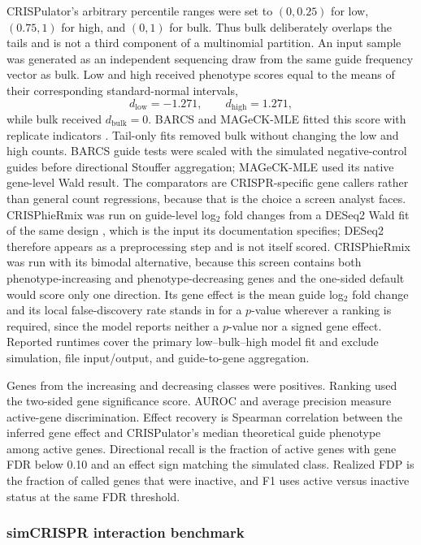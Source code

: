 CRISPulator's arbitrary percentile ranges were set to $(0,0.25)$ for low,
$(0.75,1)$ for high, and $(0,1)$ for bulk.  Thus bulk deliberately overlaps
the tails and is not a third component of a multinomial partition.  An input
sample was generated as an independent sequencing draw from the same guide
frequency vector as bulk.  Low and high received phenotype scores equal to
the means of their corresponding standard-normal intervals,
\[
 d_{\mathrm{low}}=-1.271,\qquad
 d_{\mathrm{high}}=1.271,
\]
while bulk received $d_{\mathrm{bulk}}=0$.  BARCS and MAGeCK-MLE fitted this
score with replicate indicators \citep{li2015mageckvispr}.
Tail-only fits removed bulk without changing the low and high counts.  BARCS
guide tests were scaled with the simulated negative-control guides before
directional Stouffer aggregation; MAGeCK-MLE used its native gene-level Wald
result.  The comparators are CRISPR-specific gene callers rather than general
count regressions, because that is the choice a screen analyst faces.
CRISPhieRmix \citep{daley2018crisphiermix} was run on guide-level log$_2$
fold changes from a DESeq2 Wald fit of the same design
\citep{love2014deseq2}, which is the input its documentation specifies;
DESeq2 therefore appears as a preprocessing step and is not itself scored.
CRISPhieRmix was run with its bimodal alternative, because this screen
contains both phenotype-increasing and phenotype-decreasing genes and the
one-sided default would score only one direction.  Its gene effect is the
mean guide log$_2$ fold change and its local false-discovery rate stands in
for a $p$-value wherever a ranking is required, since the model reports
neither a $p$-value nor a signed gene effect.  Reported runtimes cover the
primary low--bulk--high model fit and exclude simulation, file input/output,
and guide-to-gene aggregation.

Genes from the increasing and decreasing classes were positives.  Ranking
used the two-sided gene significance score.  AUROC and average precision
measure active-gene discrimination.  Effect recovery is Spearman correlation
between the inferred gene effect and CRISPulator's median theoretical guide
phenotype among active genes.  Directional recall is the fraction of active
genes with gene FDR below 0.10 and an effect sign matching the simulated
class.  Realized FDP is the fraction of called genes that were inactive, and
F1 uses active versus inactive status at the same FDR threshold.

\subsubsection{simCRISPR interaction benchmark}

